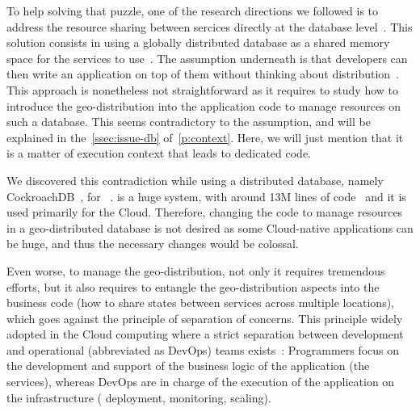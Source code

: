 To help solving that puzzle, one of the research directions we
followed is to address the resource sharing between sercices directly
at the database level~\cite{LPSD17, VSK18, RLA19}.
%
This solution consists in using a globally distributed database as a
shared memory space for the services to use~\cite{CDEF+12}.
%
The assumption underneath is that developers can then write an
application on top of them without thinking about
distribution~\cite{SBPB+18,SS19}.
%
%
%
%
%
This approach is nonetheless not straightforward as it requires to
study how to introduce the geo-distribution into the application code
to manage resources on such a database.
%
This seems contradictory to the assumption, and will be explained in
the~\autoref{ssec:issue-db} of~\autoref{p:context}.
%
Here, we will just mention that it is a matter of execution context
that leads to dedicated code.
%
%

We discovered this contradiction while using a distributed database,
namely CockroachDB~\cite{cockroachdb}, for \os~\cite{Che17,DCL18}.
%
\os is a huge system, with around 13M lines of
code~\cite{openstackloc} and it is used primarily for the Cloud.
%
%
Therefore, changing the code to manage resources in a geo-distributed
database is not desired as some Cloud-native applications can be huge,
and thus the necessary changes would be colossal.
%

Even worse, to manage the geo-distribution, not only it requires
tremendous efforts, but it also requires to entangle the
  geo-distribution aspects into the business code (\eg how to share
states between \glspl{service} across multiple locations), which goes
against the principle of separation of concerns.
%
This principle widely adopted in the Cloud computing where a strict
separation between development and operational (abbreviated as
\gls{DevOps}) teams exists~\cite{HKR13, LLGZG19}:
%
Programmers focus on the development and support of the business logic
of the application (\ie the \glspl{service}), whereas \gls{DevOps} are in
charge of the execution of the application on the infrastructure (\eg
deployment, monitoring, scaling).
%

